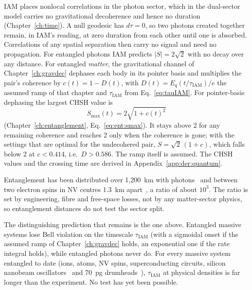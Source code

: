 IAM places nonlocal correlations in the photon sector, which in the dual-sector model carries no gravitational
decoherence and hence no duration (Chapter~\ref{ch:time}). A null geodesic has $d\tau=0$, so
two photons created together remain, in IAM's reading, at zero duration from each other
until one is absorbed. Correlations of any spatial separation then carry no signal and need
no propagation. \interp{} For entangled photons IAM predicts $|S|=2\sqrt2$ with no decay over any
distance. \prediction{} For entangled \emph{matter}, the gravitational channel of Chapter~\ref{ch:gravdec} dephases each body in its pointer basis and
multiplies the pair's coherence by $c(t)=1-D(t)$, with $D(t)=E_q(t/\tau_{\mathrm{IAM}})/e$ the assumed ramp of that chapter and
$\tau_{\mathrm{IAM}}$ from Eq.~\eqref{eq:tauIAM}. For pointer-basis dephasing the largest CHSH value is
\begin{equation}
 S_{\max}(t)=2\sqrt{1+c(t)^2}
\end{equation}
(Chapter~\ref{ch:entanglement}, Eq.~\eqref{eq:ent:smax}). \derived{} It stays above 2 for any remaining coherence and reaches 2 only when
the coherence is gone; with the settings that are optimal for the undecohered pair, $S=\sqrt2\,(1+c)$, which falls below 2 at $c<0.414$,
i.e.\ $D>0.586$. \calc{} The ramp itself is assumed. \conjecture
The CHSH values and the crossing time are derived in Appendix~\ref{app:der:quantum}.

\begin{checkbox}[title={Independent check: what entanglement distances show}]
Entanglement has been distributed over 1{,}200~km with photons~\cite{Yin2017} and between two
electron spins in NV centres 1.3~km apart~\cite{Hensen2015}, a ratio of about $10^3$. The
ratio is set by engineering, fibre and free-space losses, not by any matter-sector physics, so
entanglement distances do not test the sector split. \observed

The distinguishing prediction that remains is the one above. Entangled massive systems lose
Bell violation on the timescale $\tau_{\mathrm{IAM}}$ (with a sigmoidal onset if the assumed ramp
of Chapter~\ref{ch:gravdec} holds, an exponential one if the rate integral holds), while
entangled photons never do. \prediction{} For every massive system entangled to date (ions,
atoms, NV spins, superconducting circuits, silicon nanobeam oscillators~\cite{Riedinger2018} and
70~pg drumheads~\cite{Kotler2021}), $\tau_{\mathrm{IAM}}$ at physical densities is far
longer than the experiment. No test has yet been possible.
\end{checkbox}

